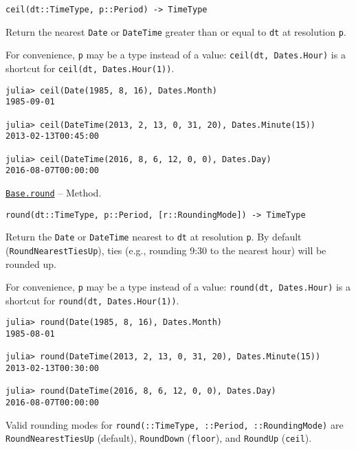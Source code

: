 \begin{adjustwidth}{2em}{0pt}


\begin{verbatim}
ceil(dt::TimeType, p::Period) -> TimeType
\end{verbatim}

Return the nearest \texttt{Date} or \texttt{DateTime} greater than or equal to \texttt{dt} at resolution \texttt{p}.

For convenience, \texttt{p} may be a type instead of a value: \texttt{ceil(dt, Dates.Hour)} is a shortcut for \texttt{ceil(dt, Dates.Hour(1))}.


\begin{verbatim}
julia> ceil(Date(1985, 8, 16), Dates.Month)
1985-09-01

julia> ceil(DateTime(2013, 2, 13, 0, 31, 20), Dates.Minute(15))
2013-02-13T00:45:00

julia> ceil(DateTime(2016, 8, 6, 12, 0, 0), Dates.Day)
2016-08-07T00:00:00
\end{verbatim}



\end{adjustwidth}
\hypertarget{11570783396170921526}{} 
\hyperlink{11570783396170921526}{\texttt{Base.round}}  -- {Method.}

\begin{adjustwidth}{2em}{0pt}


\begin{verbatim}
round(dt::TimeType, p::Period, [r::RoundingMode]) -> TimeType
\end{verbatim}

Return the \texttt{Date} or \texttt{DateTime} nearest to \texttt{dt} at resolution \texttt{p}. By default (\texttt{RoundNearestTiesUp}), ties (e.g., rounding 9:30 to the nearest hour) will be rounded up.

For convenience, \texttt{p} may be a type instead of a value: \texttt{round(dt, Dates.Hour)} is a shortcut for \texttt{round(dt, Dates.Hour(1))}.


\begin{verbatim}
julia> round(Date(1985, 8, 16), Dates.Month)
1985-08-01

julia> round(DateTime(2013, 2, 13, 0, 31, 20), Dates.Minute(15))
2013-02-13T00:30:00

julia> round(DateTime(2016, 8, 6, 12, 0, 0), Dates.Day)
2016-08-07T00:00:00
\end{verbatim}

Valid rounding modes for \texttt{round(::TimeType, ::Period, ::RoundingMode)} are \texttt{RoundNearestTiesUp} (default), \texttt{RoundDown} (\texttt{floor}), and \texttt{RoundUp} (\texttt{ceil}).



\end{adjustwidth}

